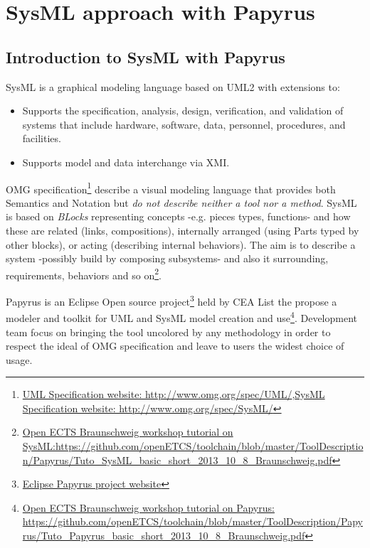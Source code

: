 
\section{SysML approach with Papyrus}
\label{section:sysml}

\subsection{Introduction to SysML with Papyrus}

SysML is a graphical modeling language based on UML2 with extensions to:
\begin{itemize}
	\item Supports the specification, analysis, design, verification, and validation of systems that include hardware, software, data, personnel, procedures, and facilities.
	\item Supports model and data interchange via XMI.
\end{itemize}
OMG specification\footnote{\href{http://www.omg.org/spec/UML/}{UML Specification website: http://www.omg.org/spec/UML/},\newline \href{http://www.omg.org/spec/SysML/} {SysML Specification website: http://www.omg.org/spec/SysML/}} describe a visual modeling language that provides both Semantics and Notation but \emph{do not describe neither a tool nor a method}.
SysML is based on \emph{BLocks} representing concepts -e.g. pieces types, functions- and how these are related (links, compositions), internally arranged (using Parts typed by other blocks), or acting (describing internal behaviors). The aim is to describe a system -possibly build by composing subsystems- and also it surrounding, requirements, behaviors and so on\footnote{\href{https://github.com/openETCS/toolchain/blob/master/ToolDescription/Papyrus/Tuto_SysML_basic_short_2013_10_8_Braunschweig.pdf}{Open ECTS Braunschweig workshop tutorial on SysML:\newline https://github.com/openETCS/toolchain/blob/master/ToolDescription/Papyrus/Tuto\_SysML\_basic\_short\_2013\_10\_8\_Braunschweig.pdf}}.

Papyrus is an Eclipse Open source project\footnote{\href{http://www.eclipse.org/papyrus/}{Eclipse Papyrus project website}} held by CEA List the propose a modeler and toolkit for UML and SysML model creation and use\footnote{\href{https://github.com/openETCS/toolchain/blob/master/ToolDescription/Papyrus/Tuto_Papyrus_basic_short_2013_10_8_Braunschweig.pdf}{Open ECTS Braunschweig workshop tutorial on Papyrus: \newline https://github.com/openETCS/toolchain/blob/master/ToolDescription/Papyrus/Tuto\_Papyrus\_basic\_short\_2013\_10\_8\_Braunschweig.pdf}}. Development team focus on bringing the tool uncolored by any methodology in order to respect the ideal of OMG specification and leave to users the widest choice of usage.

